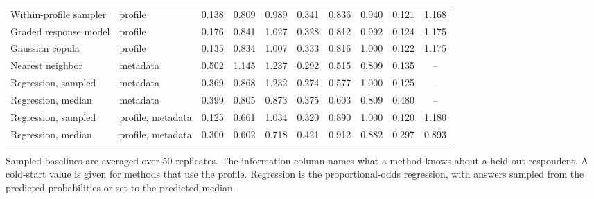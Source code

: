 \begin{table}[pos=!htbp]
\begin{tabular*}{\textwidth}{@{\extracolsep{\fill}}llcccccccc@{}}
Within-profile sampler & profile & 0.138 & 0.809 & 0.989 & 0.341 & 0.836 & 0.940 & 0.121 & 1.168 \\
Graded response model & profile & 0.176 & 0.841 & 1.027 & 0.328 & 0.812 & 0.992 & 0.124 & 1.175 \\
Gaussian copula & profile & 0.135 & 0.834 & 1.007 & 0.333 & 0.816 & 1.000 & 0.122 & 1.175 \\
Nearest neighbor & metadata & 0.502 & 1.145 & 1.237 & 0.292 & 0.515 & 0.809 & 0.135 & -- \\
Regression, sampled & metadata & 0.369 & 0.868 & 1.232 & 0.274 & 0.577 & 1.000 & 0.125 & -- \\
Regression, median & metadata & 0.399 & 0.805 & 0.873 & 0.375 & 0.603 & 0.809 & 0.480 & -- \\
Regression, sampled & profile, metadata & 0.125 & 0.661 & 1.034 & 0.320 & 0.890 & 1.000 & 0.120 & 1.180 \\
Regression, median & profile, metadata & 0.300 & 0.602 & 0.718 & 0.421 & 0.912 & 0.882 & 0.297 & 0.893 \\
\bottomrule
\end{tabular*}
\par\smallskip
\scriptsize Sampled baselines are averaged over 50 replicates. The information column names what a method knows about a held-out respondent. A cold-start value is given for methods that use the profile. Regression is the proportional-odds regression, with answers sampled from the predicted probabilities or set to the predicted median.
\end{table}

